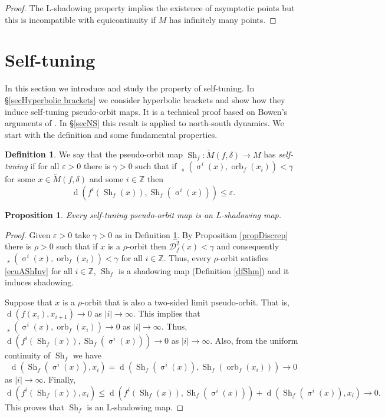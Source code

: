 \documentclass[12pt]{amsart}
\DeclareMathOperator{\shift}{\sigma}
\theoremstyle{plain}
\newtheorem{prop}[thm]{Proposition}
\theoremstyle{definition}
\newtheorem{df}[thm]{Definition}
\theoremstyle{remark}
\DeclareMathOperator{\dist}{d}
\DeclareMathOperator{\tdist}{\tilde{d}}
\DeclareMathOperator{\orb}{orb}
\DeclareMathOperator{\shm}{Sh}
\newcommand{\Z}{\mathbb Z}
\renewcommand{\epsilon}{\varepsilon}
\newcommand{\tM}{\tilde{M}}
\begin{document}
\begin{proof}
	The L-shadowing property implies the existence of asymptotic points but this is incompatible with equicontinuity if $M$ has infinitely many points.
\end{proof}


\section{Self-tuning}
\label{secAlmShInvShm}
In this section we introduce and study the property of self-tuning. In \S\ref{secHyperbolic brackets} we consider hyperbolic brackets and show how they induce self-tuning pseudo-orbit maps.
It is a technical proof based on Bowen's arguments of \cite{Bowen75}.
In \S\ref{secNS} this result is applied to north-south dynamics.
We start with the definition and some fundamental properties.
\begin{df}
	\label{defAlmSHM}
	We say that the pseudo-orbit map $\shm_f\colon \tM(f,\delta)\to M$ has \textit{self-tuning} if for all $\epsilon>0$ there is $\gamma>0$ such that if
	$\tdist_s(\shift^i(x),\orb_f(x_i))<\gamma$ for some $x\in \tM(f,\delta)$ and some $i\in\Z$ then
	\begin{equation}
		\label{ecuAShInv}
		\dist(f^i(\shm_f(x)),\shm_f(\shift^i(x)))\leq\epsilon.
	\end{equation}
\end{df}

\begin{prop}
	\label{propAlmSHMimpL-shm}
	Every self-tuning pseudo-orbit map is an L-shadowing map.
\end{prop}

\begin{proof}

	Given $\epsilon>0$ take $\gamma>0$ as in Definition \ref{defAlmSHM}.
	By Proposition \ref{propDiscrep} there is $\rho>0$ such that if
	$x$ is a $\rho$-orbit then $\mathcal{D}^2_f(x)<\gamma$ and
	consequently
	$\tdist_s(\shift^i(x),\orb_f(x_i))<\gamma$ for all $i\in\Z$.
	Thus, every $\rho$-orbit satisfies \eqref{ecuAShInv} for all $i\in\Z$, $\shm_f$ is a shadowing map (Definition \ref{dfShm}) and it induces shadowing.

	Suppose that $x$ is a $\rho$-orbit that is also a two-sided limit pseudo-orbit. That is, $\dist(f(x_i),x_{i+1})\to 0$ as $|i|\to\infty$.
	This implies that $\tdist_s(\shift^i(x),\orb_f(x_i))\to 0$ as
	$|i|\to\infty$.
	Thus,
	$\dist(f^i(\shm_f(x)),\shm_f(\shift^i(x)))\to 0$ as $|i|\to\infty$.
	Also, from the uniform continuity of $\shm_f$ we have
	$$\dist(\shm_f(\shift^i(x)),x_i)
	=\dist(\shm_f(\shift^i(x)),\shm_f(\orb_f(x_i)))
	\to 0$$
	as $|i|\to\infty$.
	Finally,
	\[
	\dist(f^i(\shm_f(x)),x_i) \leq
	\dist(f^i(\shm_f(x)),\shm_f(\shift^i(x)))+
	\dist(\shm_f(\shift^i(x)),x_i)\to 0.
	\]
	This proves that $\shm_f$ is an L-shadowing map.
\end{proof}
\end{document}

